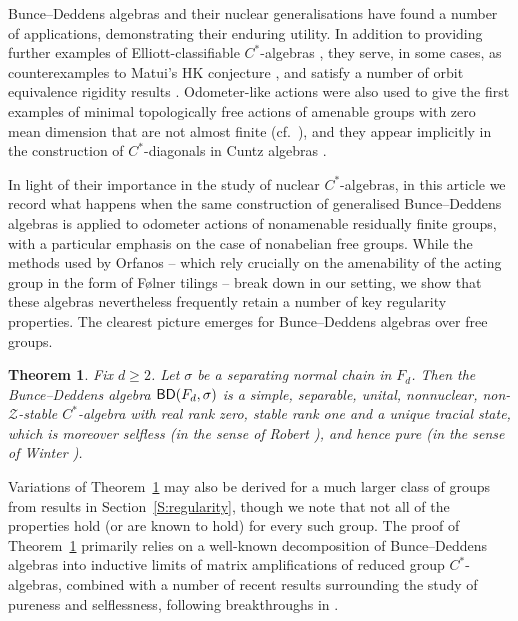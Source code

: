 \documentclass[11pt,a4,leqno]{amsart}
\theoremstyle{definition}
\theoremstyle{remark}
\numberwithin{equation}{section}
\theoremstyle{plain}
\newcounter{theoremintro}
\newtheorem{thmx}[theoremintro]{Theorem}
\newcommand{\BD}{{\sf{BD}}}
\begin{document}
Bunce--Deddens algebras and their nuclear generalisations have found a number of applications, demonstrating their enduring utility. In addition to providing further examples of Elliott-classifiable $C^*$-algebras \cite{Car11}, they serve, in some cases, as counterexamples to Matui's HK conjecture \cite{Sca20,Dee23}, and satisfy a number of orbit equivalence rigidity results \cite{CorMed16,GioPutSka19}. Odometer-like actions were also used to give the first examples of minimal topologically free actions of amenable groups with zero mean dimension that are not almost finite \cite{Jos24b} (cf.~\cite{GarGefGesKopNar24}), and they appear implicitly in the construction of $C^*$-diagonals in Cuntz algebras \cite{EviSib26}.  

In light of their importance in the study of nuclear $C^*$-algebras, in this article we record what happens when the same construction of generalised Bunce--Deddens algebras is applied to odometer actions of nonamenable residually finite groups, with a particular emphasis on the case of nonabelian free groups. While the methods used by Orfanos -- which rely crucially on the amenability of the acting group in the form of F{\o}lner tilings -- break down in our setting, we show that these algebras nevertheless frequently retain a number of key regularity properties. The clearest picture emerges for Bunce--Deddens algebras over free groups. 

\begin{thmx}\label{T:A}
    Fix $d\ge 2$. Let $\sigma$ be a separating normal chain in $F_d$. Then the Bunce--Deddens algebra $\BD (F_d,\sigma)$ is a simple, separable, unital, nonnuclear, non-$\mathcal{Z}$-stable $C^*$-algebra with real rank zero, stable rank one and a unique tracial state, which is moreover selfless (in the sense of Robert \cite{Rob25}), and hence pure (in the sense of Winter \cite{Win12}). 
\end{thmx}

Variations of Theorem~\ref{T:A} may also be derived for a much larger class of groups from results in Section~\ref{S:regularity}, though we note that not all of the properties hold (or are known to hold) for every such group. The proof of Theorem~\ref{T:A} primarily relies on a well-known decomposition of Bunce--Deddens algebras into inductive limits of matrix amplifications of reduced group $C^*$-algebras, combined with a number of recent results surrounding the study of pureness and selflessness, following breakthroughs in \cite{Rob25,AmrGaoKunPat25,Oza25}. 
\end{document}

